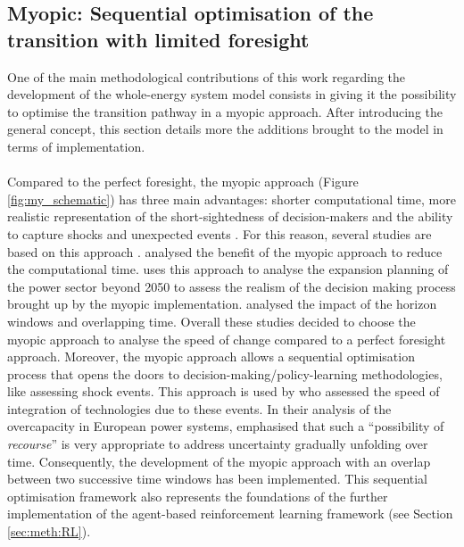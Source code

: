 \subsection[Myopic: Sequential optimisation of the transition]{Myopic: Sequential optimisation of the transition with limited foresight}
\label{subsec:meth:MY}

One of the main methodological contributions of this work regarding the development of the whole-energy system model consists in giving it the possibility to optimise the transition pathway in a myopic approach. After introducing the general concept, this section details more the additions brought to the model in terms of implementation.\\

\\

Compared to the perfect foresight, the myopic approach (Figure \ref{fig:my_schematic}) has three main advantages: shorter computational time, more realistic representation of the short-sightedness of decision-makers and the ability to capture shocks and unexpected events \cite{mccollum2020energy}. For this reason, several studies are based on this approach \citep{babrowski2014reducing,poncelet2016myopic,nerini2017myopic,heuberger2018impact}. \citet{babrowski2014reducing} analysed the benefit of the myopic approach to reduce the computational time. \citet{poncelet2016myopic} uses this approach to analyse the expansion planning of the power sector beyond 2050 to assess the realism of the decision making process brought up by the myopic implementation. \citet{nerini2017myopic} analysed the impact of the horizon windows and overlapping time.  Overall these studies decided to choose the myopic approach to analyse the speed of change compared to a perfect foresight approach.
Moreover, the myopic approach allows a sequential optimisation process that opens the doors to decision-making/policy-learning methodologies, like assessing shock events. This approach is used by \citet{heuberger2018impact} who assessed the speed of integration of technologies due to these events. 
In their analysis of the overcapacity in European power systems, \citet{moret2020overcapacity} emphasised that such a ``possibility of \textit{recourse}'' is very appropriate to address uncertainty gradually unfolding over time. Consequently, the development of the myopic approach with an overlap between two successive time windows has been implemented. This sequential optimisation framework also represents the foundations of the further implementation of the agent-based reinforcement learning framework (see Section \ref{sec:meth:RL}).


